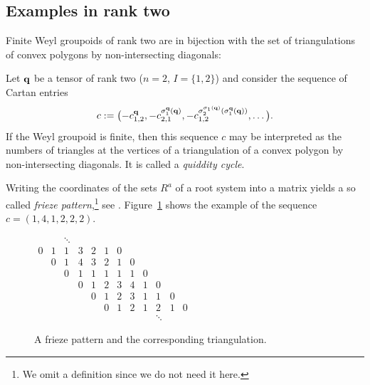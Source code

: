 \documentclass[10pt,a4paper]{amsart}
\numberwithin{equation}{section}
\newcommand{\qq }{{\bf q}}
\begin{document}
\subsection{Examples in rank two}

Finite Weyl groupoids of rank two are in bijection with
the set of triangulations of convex polygons by non-intersecting diagonals:

Let $\qq$ be a tensor of rank two ($n=2$, $I=\{1,2\}$) and consider the sequence of Cartan entries
\[c := \bigl(-c^\qq_{1,2},-c^{\sigma^\qq_1(\qq)}_{2,1},-c^{\sigma^{\sigma_1(\qq)}_2(\sigma^\qq_1(\qq))}_{1,2},\dots\bigr). \]
If the Weyl groupoid is finite, then this sequence $c$ may be interpreted as the numbers of triangles at the vertices of a triangulation of a convex polygon by non-intersecting diagonals. It is called a {\it quiddity cycle}.

Writing the coordinates of the sets $R^a$ of a root system into a matrix yields a so called {\it frieze pattern},\footnote{We omit a definition since we do not need it here.} see \cite{p-C14}. Figure~\ref{frieze} shows the example of the sequence $c=(1,4,1,2,2,2)$.
\begin{figure}[h]
 \centering
 \begin{minipage}[b]{0.44\textwidth}
 $ \begin{array}{cccccccccccc}
 & & \ddots & & & & & & & & & \\
 0 & 1 & 1 & 3 & 2 & 1 & 0 & & & & & \\
& 0 & 1 & 4 & 3 & 2 & 1 & 0 & & & & \\
 & & 0 & 1 & 1 & 1 & 1 & 1 & 0 & & & \\
 & & & 0 & 1 & 2 & 3 & 4 & 1 & 0 & & \\
 & & & & 0 & 1 & 2 & 3 & 1 & 1 & 0 & \\
 & & & & & 0 & 1 & 2 & 1 & 2 & 1 & 0 \\
 & & & & & & & & & \ddots & &
\end{array}
$
 \end{minipage}
 \qquad \qquad
 \begin{minipage}[b]{0.32\textwidth}
 \end{minipage}
\caption{A frieze pattern and the corresponding triangulation.\label{frieze}}
\end{figure}
\end{document}
